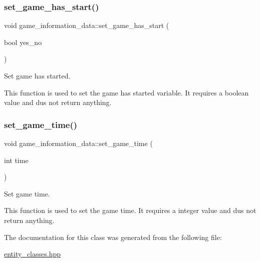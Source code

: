 \subsubsection{\texorpdfstring{set\+\_\+game\+\_\+has\+\_\+start()}{set\_game\_has\_start()}}
{\footnotesize\ttfamily void game\+\_\+information\+\_\+data\+::set\+\_\+game\+\_\+has\+\_\+start (\begin{DoxyParamCaption}\item[{bool}]{yes\+\_\+no }\end{DoxyParamCaption})\hspace{0.3cm}{\ttfamily [inline]}}



Set game has started. 

This function is used to set the game has started variable. It requires a boolean value and dus not return anything. \hypertarget{classgame__information__data_a641a08d61da5a638cb7fe78b9c71cb11}{}\label{classgame__information__data_a641a08d61da5a638cb7fe78b9c71cb11} 
\subsubsection{\texorpdfstring{set\+\_\+game\+\_\+time()}{set\_game\_time()}}
{\footnotesize\ttfamily void game\+\_\+information\+\_\+data\+::set\+\_\+game\+\_\+time (\begin{DoxyParamCaption}\item[{int}]{time }\end{DoxyParamCaption})\hspace{0.3cm}{\ttfamily [inline]}}



Set game time. 

This function is used to set the game time. It requires a integer value and dus not return anything. 

The documentation for this class was generated from the following file\+:\begin{DoxyCompactItemize}
\item 
\hyperlink{entity__classes_8hpp}{entity\+\_\+classes.\+hpp}\end{DoxyCompactItemize}
